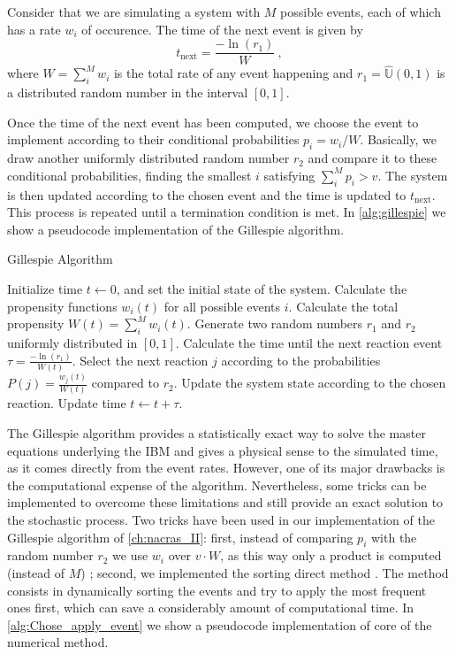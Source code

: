 Consider that we are simulating a system with $M$ possible events, each of
which has a rate $w_i$ of occurence. The time of the next event is given by
\begin{equation}
  t_{\textrm{next}}=\frac{-\ln(r_1)}{W} \ ,
\end{equation}
where $W=\sum_i^M w_i$ is the total rate of any event happening and
$r_1=\hat{\mathbb{U}}(0,1)$ is a distributed random number in the interval
$[0,1]$.

Once the time of the next event has been computed, we choose the event to
implement according to their conditional probabilities $p_i=w_i/W$. Basically,
we draw another uniformly distributed random number $r_2$ and compare it to
these conditional probabilities, finding the smallest $i$ satisfying
$\sum_i^Mp_i>v$. The system is then updated according to the chosen event and
the time is updated to $t_{\textrm{next}}$. This process is repeated until a
termination condition is met. In \cref{alg:gillespie} we show a pseudocode
implementation of the Gillespie algorithm.

\begin{algorithm}
  \caption{Gillespie Algorithm}
  \label{alg:gillespie}
  \begin{algorithmic}[1]
    \State Initialize time $t \gets 0$, and set the initial state of the
    system.
    \State Calculate the propensity functions $w_i(t)$ for all possible
    events $i$.
    \State Calculate the total propensity $W(t) = \sum_i^M w_i(t)$.
    \State Generate two random numbers $r_1$ and $r_2$ uniformly
    distributed in $[0,1]$.
    \State Calculate the time until the next reaction event $\tau =
      \frac{-\ln(r_1)}{W(t)}$.
    \State Select the next reaction $j$ according to the probabilities
    $P(j) = \frac{w_j(t)}{W(t)}$ compared to $r_2$.
    \State Update the system state according to the chosen reaction.
    \State Update time $t \gets t + \tau$.
    \EndWhile
  \end{algorithmic}
\end{algorithm}

The Gillespie algorithm provides a statistically exact way to solve the
master equations underlying the IBM and gives a physical sense to the simulated
time, as it comes directly from the event rates. However, one of its major
drawbacks is the computational expense of the algorithm. Nevertheless, some
tricks can be implemented to overcome these limitations and still provide an
exact solution to the stochastic process. Two tricks have been used in our
implementation of the Gillespie algorithm of \cref{ch:nacras_II}: first,
instead of comparing $p_i$ with the random number $r_2$ we use $w_i$ over
$v\cdot W$, as this way only a product is computed (instead of $M$)
\cite{Toral_master_eqs}; second, we implemented the sorting direct method
\cite{MCCOLLUM200639}. The method consists in dynamically sorting the events
and try to apply the most frequent ones first, which can save a considerably
amount of computational time. In \cref{alg:Chose_apply_event} we show a
pseudocode implementation of core of the numerical method.

